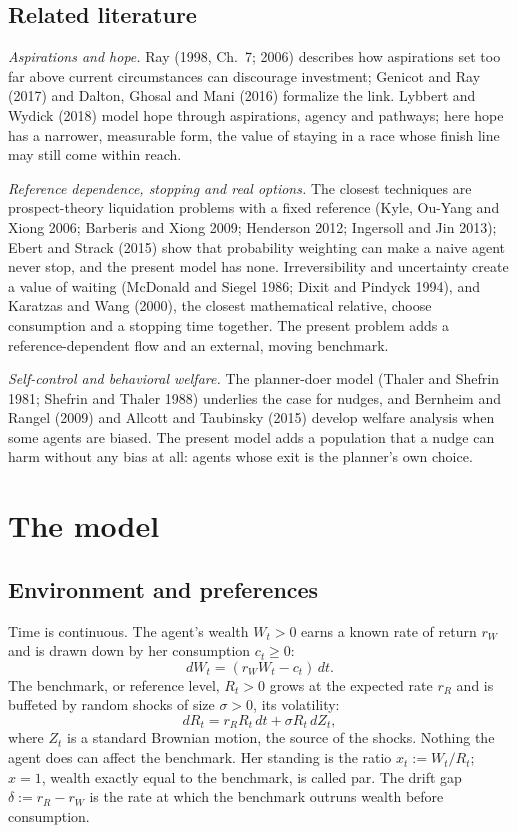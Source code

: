\documentclass[12pt]{article}
\theoremstyle{definition}
\theoremstyle{remark}
\theoremstyle{plain}
\theoremstyle{definition}
\begin{document}
\subsection{Related literature}

\emph{Aspirations and hope.} Ray (1998, Ch.~7; 2006) describes how aspirations set too far above current circumstances can discourage investment; Genicot and Ray (2017) and Dalton, Ghosal and Mani (2016) formalize the link. Lybbert and Wydick (2018) model hope through aspirations, agency and pathways; here hope has a narrower, measurable form, the value of staying in a race whose finish line may still come within reach.

\emph{Reference dependence, stopping and real options.} The closest techniques are prospect-theory liquidation problems with a fixed reference (Kyle, Ou-Yang and Xiong 2006; Barberis and Xiong 2009; Henderson 2012; Ingersoll and Jin 2013); Ebert and Strack (2015) show that probability weighting can make a naive agent never stop, and the present model has none. Irreversibility and uncertainty create a value of waiting (McDonald and Siegel 1986; Dixit and Pindyck 1994), and Karatzas and Wang (2000), the closest mathematical relative, choose consumption and a stopping time together. The present problem adds a reference-dependent flow and an external, moving benchmark.

\emph{Self-control and behavioral welfare.} The planner-doer model (Thaler and Shefrin 1981; Shefrin and Thaler 1988) underlies the case for nudges, and Bernheim and Rangel (2009) and Allcott and Taubinsky (2015) develop welfare analysis when some agents are biased. The present model adds a population that a nudge can harm without any bias at all: agents whose exit is the planner's own choice.

\section{The model}\label{sec:model}

\subsection{Environment and preferences}

Time is continuous. The agent's wealth $W_t>0$ earns a known rate of return $r_W$ and is drawn down by her consumption $c_t\ge0$:
\begin{equation}
dW_t=(r_WW_t-c_t)\,dt .\label{eq:W}
\end{equation}
The benchmark, or reference level, $R_t>0$ grows at the expected rate $r_R$ and is buffeted by random shocks of size $\sigma>0$, its volatility:
\begin{equation}
dR_t=r_RR_t\,dt+\sigma R_t\,dZ_t ,\label{eq:R}
\end{equation}
where $Z_t$ is a standard Brownian motion, the source of the shocks. Nothing the agent does can affect the benchmark. Her standing is the ratio $x_t:=W_t/R_t$; $x=1$, wealth exactly equal to the benchmark, is called par. The drift gap $\delta:=r_R-r_W$ is the rate at which the benchmark outruns wealth before consumption.
\end{document}
